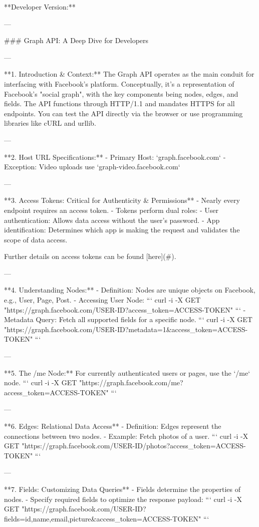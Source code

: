 **Developer Version:**

---

### Graph API: A Deep Dive for Developers

---

**1. Introduction & Context:**
The Graph API operates as the main conduit for interfacing with Facebook’s platform. Conceptually, it's a representation of Facebook’s "social graph", with the key components being nodes, edges, and fields. The API functions through HTTP/1.1 and mandates HTTPS for all endpoints. You can test the API directly via the browser or use programming libraries like cURL and urllib.

---

**2. Host URL Specifications:**
- Primary Host: `graph.facebook.com`
- Exception: Video uploads use `graph-video.facebook.com`

---

**3. Access Tokens: Critical for Authenticity & Permissions**
- Nearly every endpoint requires an access token.
- Tokens perform dual roles:
  - User authentication: Allows data access without the user's password.
  - App identification: Determines which app is making the request and validates the scope of data access. 

Further details on access tokens can be found [here](#).

---

**4. Understanding Nodes:**
- Definition: Nodes are unique objects on Facebook, e.g., User, Page, Post.
- Accessing User Node:
```
curl -i -X GET "https://graph.facebook.com/USER-ID?access_token=ACCESS-TOKEN"
```
- Metadata Query: Fetch all supported fields for a specific node.
```
curl -i -X GET "https://graph.facebook.com/USER-ID?metadata=1&access_token=ACCESS-TOKEN"
```

---

**5. The /me Node:**
For currently authenticated users or pages, use the `/me` node. 
```
curl -i -X GET "https://graph.facebook.com/me?access_token=ACCESS-TOKEN"
```

---

**6. Edges: Relational Data Access**
- Definition: Edges represent the connections between two nodes.
- Example: Fetch photos of a user.
```
curl -i -X GET "https://graph.facebook.com/USER-ID/photos?access_token=ACCESS-TOKEN"
```

---

**7. Fields: Customizing Data Queries**
- Fields determine the properties of nodes.
- Specify required fields to optimize the response payload:
```
curl -i -X GET "https://graph.facebook.com/USER-ID?fields=id,name,email,picture&access_token=ACCESS-TOKEN"
```

